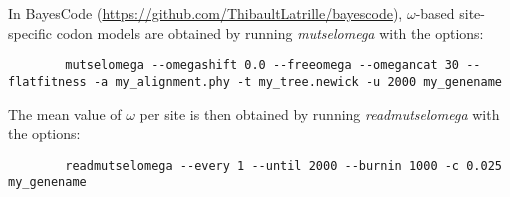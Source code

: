 \documentclass{article}
\begin{document}
    In BayesCode (\url{https://github.com/ThibaultLatrille/bayescode}), $\omega$-based site-specific codon models are obtained by running \textit{mutselomega} with the options:
    \begin{scriptsize}
        \begin{verbatim}
        mutselomega --omegashift 0.0 --freeomega --omegancat 30 --flatfitness -a my_alignment.phy -t my_tree.newick -u 2000 my_genename
        \end{verbatim}
    \end{scriptsize}
    The mean value of $\omega$ per site is then obtained by running \textit{readmutselomega} with the options:
    \begin{scriptsize}
        \begin{verbatim}
        readmutselomega --every 1 --until 2000 --burnin 1000 -c 0.025 my_genename
        \end{verbatim}
    \end{scriptsize}

    
\end{document}
